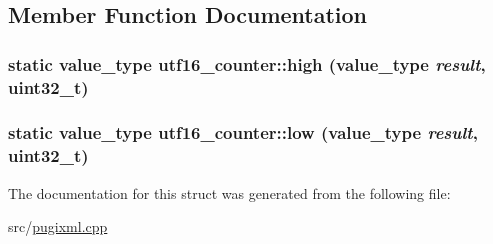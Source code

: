 \subsection{Member Function Documentation}
\hypertarget{structutf16__counter_ac1a8793996e57dc28fd22f3165628e4d}{
\subsubsection[{high}]{\setlength{\rightskip}{0pt plus 5cm}static {\bf value\_\-type} utf16\_\-counter::high ({\bf value\_\-type} {\em result}, \/  uint32\_\-t)}}
\label{structutf16__counter_ac1a8793996e57dc28fd22f3165628e4d}
\hypertarget{structutf16__counter_a4571f3d0fbf0ce763904ec3321dcb41e}{
\subsubsection[{low}]{\setlength{\rightskip}{0pt plus 5cm}static {\bf value\_\-type} utf16\_\-counter::low ({\bf value\_\-type} {\em result}, \/  uint32\_\-t)}}
\label{structutf16__counter_a4571f3d0fbf0ce763904ec3321dcb41e}


The documentation for this struct was generated from the following file:\begin{DoxyCompactItemize}
\item 
src/\hyperlink{pugixml_8cpp}{pugixml.cpp}\end{DoxyCompactItemize}
